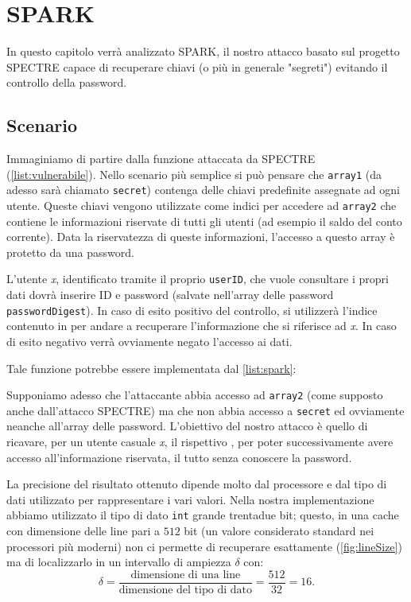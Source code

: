 \chapter{SPARK}
	In questo capitolo verrà analizzato \ac{SPARK}, il nostro attacco basato sul progetto SPECTRE capace di recuperare chiavi (o più in generale "segreti") evitando il controllo della password.
	
	\section{Scenario}
		Immaginiamo di partire dalla funzione attaccata da SPECTRE (\cref{list:vulnerabile}). Nello scenario più semplice si può pensare che \texttt{array1} (da adesso sarà chiamato \texttt{secret}) contenga delle chiavi predefinite assegnate ad ogni utente. Queste chiavi vengono utilizzate come indici  per accedere ad \texttt{array2} che contiene le informazioni riservate di tutti gli utenti (ad esempio il saldo del conto corrente). Data la riservatezza di queste informazioni, l'accesso a questo array è protetto da una password. 
		
		L'utente \emph{x}, identificato tramite il proprio \texttt{userID}, che vuole consultare i propri dati dovrà inserire ID e password (salvate nell'array delle password \texttt{passwordDigest}). In caso di esito positivo del controllo, si utilizzerà l'indice contenuto in  per andare a recuperare l'informazione che si riferisce ad \emph{x}. In caso di esito negativo verrà ovviamente negato l'accesso ai dati.
		
		Tale funzione potrebbe essere implementata dal \cref{list:spark}:
		
		Supponiamo adesso che l'attaccante abbia accesso ad \texttt{array2} (come supposto anche dall'attacco SPECTRE) ma che non abbia accesso a \texttt{secret} ed ovviamente neanche all'array delle password. L'obiettivo del nostro attacco è quello di ricavare, per un utente casuale \emph{x}, il rispettivo , per poter successivamente avere accesso all'informazione riservata, il tutto senza conoscere la password.
		
		La precisione del risultato ottenuto dipende molto dal processore e dal tipo di dati utilizzato per rappresentare i vari valori. Nella nostra implementazione abbiamo utilizzato il tipo di dato \texttt{int} grande trentadue bit; questo, in una cache con dimensione delle line pari a $512$ bit (un valore considerato standard nei processori più moderni) non ci permette di recuperare esattamente  (\cref{fig:lineSize}) ma di localizzarlo in un intervallo di ampiezza $\delta$ con: $$\delta = \frac{\text{dimensione di una line}}{\text{dimensione del tipo di dato}} = \frac{512}{32} = 16.$$
		
